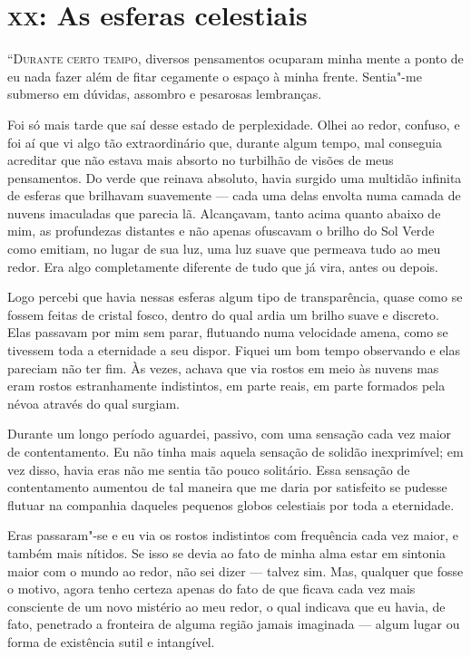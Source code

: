 \clearpage

\chapter{\textsc{xx}:  As esferas celestiais}

\textsc{“Durante certo tempo,} diversos pensamentos ocuparam minha mente a ponto de eu nada fazer além de fitar cegamente o
espaço à minha frente. Sentia"-me submerso em dúvidas, assombro e pesarosas lembranças.

Foi só mais tarde que saí desse estado de perplexidade. Olhei ao redor, confuso, e foi aí que vi algo tão
extraordinário que, durante algum tempo, mal conseguia acreditar que não estava mais absorto no turbilhão de visões de
meus pensamentos. Do verde que reinava absoluto, havia surgido uma multidão infinita de esferas que brilhavam
suavemente --- cada uma delas envolta numa camada de nuvens imaculadas que parecia lã. Alcançavam, tanto acima quanto
abaixo de mim, as profundezas distantes e não apenas ofuscavam o brilho do Sol Verde como emitiam, no lugar de sua
luz, uma luz suave que permeava tudo ao meu redor. Era algo completamente diferente de tudo que já vira, antes ou
depois.

Logo percebi que havia nessas esferas algum tipo de transparência, quase como se fossem feitas de cristal fosco, dentro
do qual ardia um brilho suave e discreto. Elas passavam por mim sem parar, flutuando numa velocidade amena, como se
tivessem toda a eternidade a seu dispor. Fiquei um bom tempo observando e elas pareciam não ter fim. Às vezes, achava
que via rostos em meio às nuvens mas eram rostos estranhamente indistintos, em parte reais, em parte formados pela
névoa através do qual surgiam.

Durante um longo período aguardei, passivo, com uma sensação cada vez maior de contentamento. Eu não tinha mais
aquela sensação de solidão inexprimível; em vez disso, havia eras não me sentia tão pouco solitário. Essa sensação de
contentamento aumentou de tal maneira que me daria por satisfeito se pudesse flutuar na companhia daqueles pequenos
globos celestiais por toda a eternidade.

Eras passaram"-se e eu via os rostos indistintos com frequência cada vez maior, e também mais nítidos. Se isso se devia
ao fato de minha alma estar em sintonia maior com o mundo ao redor, não sei dizer --- talvez sim. Mas, qualquer que fosse
o motivo, agora tenho certeza apenas do fato de que ficava cada vez mais consciente de um novo mistério ao meu redor, o
qual indicava que eu havia, de fato, penetrado a fronteira de alguma região jamais imaginada --- algum lugar ou forma de
existência sutil e intangível.

